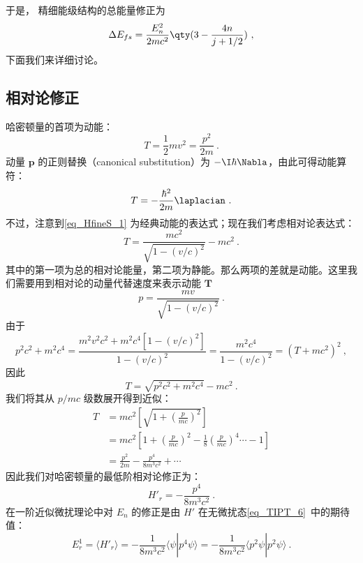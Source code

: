 于是， 精细能级结构的总能量修正为
\begin{equation}
\Delta E_{fs} = \frac{E_n^2}{2mc^2}\qty(3 - \frac{4n}{j + 1/2})~,
\end{equation}
下面我们来详细讨论。

\subsection{相对论修正}
哈密顿量的首项为动能：
\begin{equation}\label{eq_HfineS_1}
T=\frac{1}{2}mv^2=\frac{p^2}{2m}~.
\end{equation}
动量 $\mathbf p$ 的正则替换（canonical substitution）为 $-\I\hbar\Nabla$，由此可得动能算符：
\begin{equation}
T=-\frac{\hbar^2}{2m}\laplacian~.
\end{equation}
不过，注意到\autoref{eq_HfineS_1} 为经典动能的表达式；现在我们考虑相对论表达式：
\begin{equation}
T=\frac{mc^2}{\sqrt{1-(v/c)^2}}-mc^2~.
\end{equation}
其中的第一项为总的相对论能量，第二项为静能。那么两项的差就是动能。这里我们需要用到相对论的动量代替速度来表示动能 $\mathbf T$
\begin{equation}
p=\frac{mv}{\sqrt{1-(v/c)^2}}~.
\end{equation}
由于
\begin{equation}
p^2c^2+m^2c^4=\frac{m^2v^2c^2+m^2c^4[1-(v/c)^2]}{1-(v/c)^2}=\frac{m^2c^4}{1-(v/c)^2}=(T+mc^2)^2~,
\end{equation}
因此
\begin{equation}
T=\sqrt{p^2c^2+m^2c^4}-mc^2~.
\end{equation}
我们将其从 $p/mc$ 级数展开得到近似：
\begin{align}
T &= mc^2\left[\sqrt{1+\left(\frac{p}{mc}\right)^2}\right]\\ 
&=mc^2\left[1+\left(\frac{p}{mc}\right)^2-\frac{1}{8}\left(\frac{p}{mc}\right)^4\cdots -1\right]\\
&=\frac{p^2}{2m}-\frac{p^4}{8m^3c^2}+\cdots~
\end{align}
因此我们对哈密顿量的最低阶相对论修正为：
\begin{equation}
H'_r=-\frac{p^4}{8m^3c^2}~.
\end{equation}
在一阶近似微扰理论中对 $E_n$ 的修正是由 $H'$ 在无微扰态\autoref{eq_TIPT_6}~中的期待值：
\begin{equation}\label{eq_HfineS_16}
E_r^1=\langle H'_r\rangle=-\frac{1}{8m^3c^2}\langle\psi|p^4\psi\rangle=-\frac{1}{8m^3c^2}\langle p^2\psi|p^2\psi\rangle~.
\end{equation}
